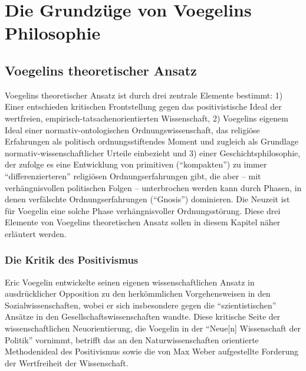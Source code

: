 

\chapter{Die Grundzüge von Voegelins Philosophie}

\section{Voegelins theoretischer Ansatz}
\label{Grundzuege}

Voegelins theoretischer Ansatz ist durch drei zentrale Elemente bestimmt: 1)
Einer entschieden kritischen Frontstellung gegen das positivistische Ideal der
wertfreien, empirisch-tatsachenorientierten Wissenschaft, 2) Voegelins eigenem
Ideal einer normativ-ontologischen Ordnungswissenschaft, das religiöse
Erfahrungen als politisch ordnungsstiftendes Moment und zugleich als Grundlage
normativ-wissenschaftlicher Urteile einbezieht und 3) einer
Geschichtsphilosophie, der zufolge es eine Entwicklung von primitiven
("`kompakten"') zu immer "`differenzierteren"' religiösen Ordnungserfahrungen
gibt, die aber -- mit verhängnisvollen politischen Folgen -- unterbrochen
werden kann durch Phasen, in denen verfälschte Ordnungserfahrungen
("`Gnosis"') dominieren. Die Neuzeit ist für Voegelin eine solche Phase
verhängnisvoller Ordnungsstörung.  Diese drei Elemente von Voegelins
theoretischen Ansatz sollen in diesem Kapitel näher erläutert werden.

\subsection{Die Kritik des Positivismus}

Eric Voegelin entwickelte seinen eigenen wissenschaftlichen Ansatz in
ausdrücklicher Opposition zu den herkömmlichen Vorgehensweisen in den
Sozialwissenschaften, wobei er sich insbesondere gegen die "`szientistischen"'
Ansätze in den Gesellschaftswissenschaften wandte. Diese kritische Seite der
wissenschaftlichen Neuorientierung, die Voegelin in der "`Neue[n] Wissenschaft
der Politik"' vornimmt, betrifft das an den Naturwissenschaften orientierte
Methodenideal des Positivismus sowie die von Max Weber aufgestellte Forderung
der Wertfreiheit der Wissenschaft.

